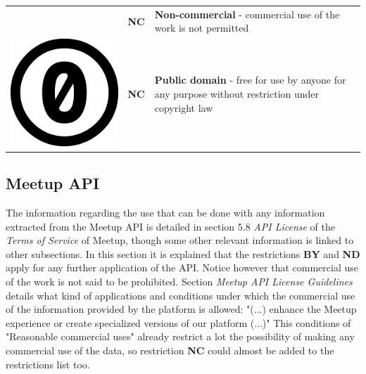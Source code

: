 \begin{table}[]
\begin{tabular}{p{1cm} p{1cm} p{10cm}}
\begin{minipage}{.1\textwidth}
    \end{minipage} & \textbf{NC} & \textbf{Non-commercial} - commercial use of the work is not permitted                                                                                               
    \\
 \begin{minipage}{.1\textwidth}
      \includegraphics[scale=.07]{images/cc_0.png}
    \end{minipage} & \textbf{NC} & \textbf{Public domain} - free for use by anyone for any purpose without restriction under copyright law \\
   \hline
\end{tabular}
\end{table}

\subsection*{Meetup API}

The information regarding the use that can be done with any information extracted from the Meetup API is detailed in section 5.8 \textit{API License} of the \textit{Terms of Service} of Meetup, though some other relevant information is linked to other subsections. In this section it is explained that the restrictions \textbf{BY} and \textbf{ND} apply for any further application of the API. Notice however that commercial use of the work is not said to be prohibited. Section \textit{Meetup API License Guidelines} details what kind of applications and conditions under which the commercial use of the information provided by the platform is allowed: "(...) enhance the Meetup experience or create specialized versions of our platform (...)" This conditions of "Reasonable commercial uses" already restrict a lot the possibility of making any commercial use of the data, so restriction \textbf{NC} could almost be added to the restrictions list too.

